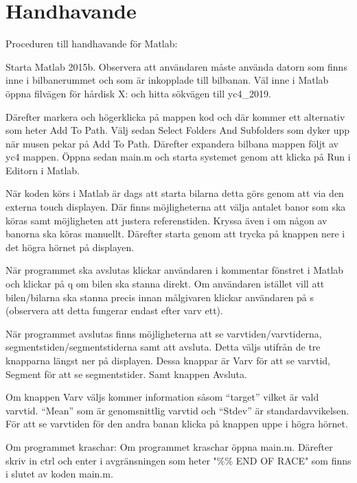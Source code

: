 \section{Handhavande}
Proceduren till handhavande för Matlab:

Starta Matlab 2015b. Observera att användaren måste använda datorn som finns
inne i bilbanerummet och som är inkopplade till bilbanan. Väl inne i Matlab
öppna filvägen för hårdisk X: och hitta sökvägen till yc4\_2019.

Därefter markera och högerklicka på mappen kod och där kommer ett alternativ som
heter Add To Path. Välj sedan Select Folders And Subfolders som dyker upp när
musen pekar på Add To Path. Därefter expandera bilbana mappen följt av yc4
mappen. Öppna sedan main.m och starta systemet genom att klicka på Run i Editorn
i Matlab.

När koden körs i Matlab är dags att starta bilarna detta görs genom att via den
externa touch displayen. Där finns möjligheterna att välja antalet banor som ska
köras samt möjligheten att justera referenstiden. Kryssa även i om någon av
banorna ska köras manuellt. Därefter starta genom att trycka på knappen nere i
det högra hörnet på displayen.

När programmet ska avslutas klickar användaren i kommentar fönstret i Matlab och
klickar på q om bilen ska stanna direkt. Om användaren istället vill att
bilen/bilarna ska stanna precis innan målgivaren klickar användaren på s
(observera att detta fungerar endast efter varv ett).

När programmet avslutas finns möjligheterna att se varvtiden/varvtiderna,
segmentstiden/segmentstiderna samt att avsluta. Detta väljs utifrån de tre
knapparna längst ner på displayen. Dessa knappar är Varv för att se varvtid,
Segment för att se segmentstider. Samt knappen Avsluta.

Om knappen Varv väljs kommer information såsom “target” vilket är vald varvtid.
“Mean” som är genomsnittlig varvtid och “Stdev” är standardavvikelsen. För att
se varvtiden för den andra banan klicka på knappen uppe i högra hörnet.

Om programmet kraschar: Om programmet kraschar öppna main.m. Därefter skriv in
ctrl och enter i avgränsningen som heter "\%\% END OF RACE" som finns i slutet av
koden main.m.

